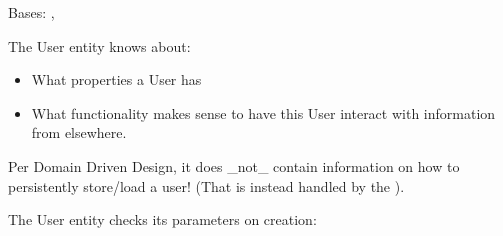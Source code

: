 \documentclass[letterpaper,10pt,english]{sphinxmanual}
\begin{document}
\begin{fulllineitems}
\label{\detokenize{pydash_app.user.entity:pydash_app.user.entity.User}}
Bases: , 

The User entity knows about:
\begin{itemize}
\item {} 
What properties a User has

\item {} 
What functionality makes sense to have this User interact with information from elsewhere.

\end{itemize}

Per Domain Driven Design, it does \_not\_ contain information on how to persistently store/load a user!
(That is instead handled by the ).

The User entity checks its parameters on creation:

%
\begin{sphinxVerbatim}[commandchars=\\\{\}]
  
\end{sphinxVerbatim}

\begin{fulllineitems}
\label{\detokenize{pydash_app.user.entity:pydash_app.user.entity.User.check_password}}
\end{fulllineitems}


\begin{fulllineitems}
\label{\detokenize{pydash_app.user.entity:pydash_app.user.entity.User.generate_new_verification_code}}
\end{fulllineitems}


\end{fulllineitems}
\end{document}
